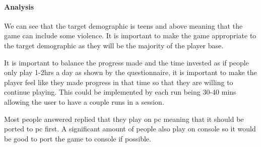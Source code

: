 \documentclass{article}
\newcommand{\parBr}{\vspace{5mm}}%
\begin{document}
\paragraph{Analysis}
 \linebreak


We can see that the target demographic is teens and above meaning that the game can include some violence. It is important to make the game appropriate to the target demographic as they will be the majority of the player base. 

\parBr

 \linebreak
{}

It is important to balance the progress made and the time invested as if people only play 1-2hrs a day as shown by the questionnaire, it is important to make the player feel like they made progress in that time so that they are willing to continue playing. This could be implemented by each run being 30-40 mins allowing the user to have a couple runs in a session.

\parBr

 \linebreak
{}

Most people answered replied that they play on pc meaning that it should be ported to pc first. A significant amount of people also play on console so it would be good to port the game to console if possible. 

\parBr

 \linebreak
{}
\end{document}
